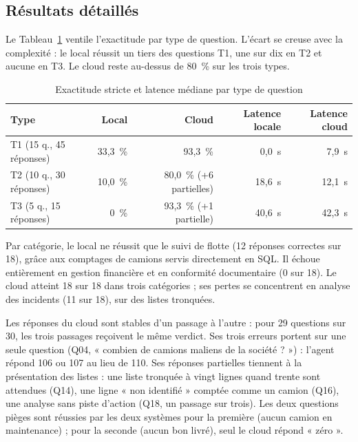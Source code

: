 \subsection{Résultats détaillés}
\label{sec:bench_detail}

Le Tableau~\ref{tab:bench_par_type} ventile l'exactitude par type de question. L'écart se creuse avec la complexité : le local réussit un tiers des questions T1, une sur dix en T2 et aucune en T3. Le cloud reste au-dessus de 80~\% sur les trois types.

\begin{table}[htbp]
\centering
\footnotesize
\caption{Exactitude stricte et latence médiane par type de question}
\label{tab:bench_par_type}
\begin{tabular}{|l|r|r|r|r|}
\hline
\rowcolor[HTML]{EFEFEF}
\textbf{Type} & \textbf{Local} & \textbf{Cloud} & \textbf{Latence locale} & \textbf{Latence cloud} \\ \hline
T1 (15 q., 45 réponses) & 33,3~\% & 93,3~\% & 0,0~s & 7,9~s \\ \hline
T2 (10 q., 30 réponses) & 10,0~\% & 80,0~\% (+6 partielles) & 18,6~s & 12,1~s \\ \hline
T3 (5 q., 15 réponses) & 0~\% & 93,3~\% (+1 partielle) & 40,6~s & 42,3~s \\ \hline
\end{tabular}
\end{table}

Par catégorie, le local ne réussit que le suivi de flotte (12 réponses correctes sur 18), grâce aux comptages de camions servis directement en SQL. Il échoue entièrement en gestion financière et en conformité documentaire (0 sur 18). Le cloud atteint 18 sur 18 dans trois catégories ; ses pertes se concentrent en analyse des incidents (11 sur 18), sur des listes tronquées.

Les réponses du cloud sont stables d'un passage à l'autre : pour 29 questions sur 30, les trois passages reçoivent le même verdict. Ses trois erreurs portent sur une seule question (Q04, « combien de camions maliens de la société ? ») : l'agent répond 106 ou 107 au lieu de 110. Ses réponses partielles tiennent à la présentation des listes : une liste tronquée à vingt lignes quand trente sont attendues (Q14), une ligne « non identifié » comptée comme un camion (Q16), une analyse sans piste d'action (Q18, un passage sur trois). Les deux questions pièges sont réussies par les deux systèmes pour la première (aucun camion en maintenance) ; pour la seconde (aucun bon livré), seul le cloud répond « zéro ».

